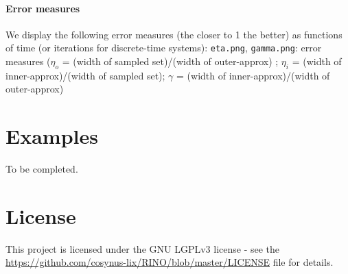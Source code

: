 \documentclass{article}
\begin{document}
\paragraph{Error measures}
We display the following error measures (the closer to 1 the better) as functions of time (or iterations for discrete-time systems):
 \texttt{eta.png},  \texttt{gamma.png}: error measures ($\eta_o$ = (width of sampled set)/(width of outer-approx) ; $\eta_i$ = (width of inner-approx)/(width of sampled set);
$\gamma$ = (width of inner-approx)/(width of outer-approx)




\section{Examples \label{examples}}

To be completed. 



\section{License}

This project is licensed under the GNU LGPLv3 license - see the \url{https://github.com/cosynus-lix/RINO/blob/master/LICENSE} file for details.








\end{document}
